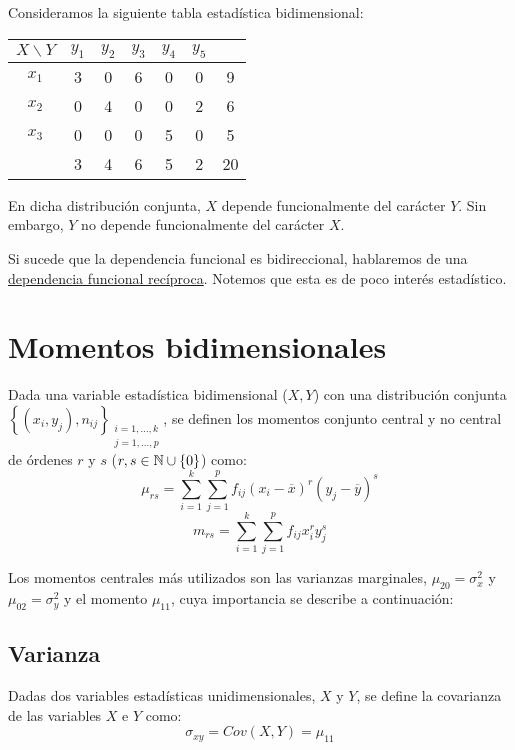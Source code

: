 \begin{ejemplo} Consideramos la siguiente tabla estadística bidimensional:
    \begin{center}
    \begin{tabular}{c|c|c|c|c|c|c}
        $X \backslash Y$ & $y_1$ & $y_2$ & $y_3$ & $y_4$ & $y_5$ &    \\
        \hline
        $x_1$            & 3     & 0     & 6     & 0     & 0     & 9  \\
        \hline
        $x_2$            & 0     & 4     & 0     & 0     & 2     & 6  \\
        \hline
        $x_3$            & 0     & 0     & 0     & 5     & 0     & 5  \\
        \hline
                         & 3     & 4     & 6     & 5     & 2     & 20 \\
    \end{tabular}
    \end{center}
    
    
    En dicha distribución conjunta, $X$ depende funcionalmente del carácter $Y$. Sin embargo, $Y$ no depende
    funcionalmente del carácter $X$.
\end{ejemplo}

Si sucede que la dependencia funcional es bidireccional, hablaremos de una \underline{dependencia funcional recíproca}.
Notemos que esta es de poco interés estadístico.

\section{Momentos bidimensionales}

Dada una variable estadística bidimensional ($X,Y$) con una distribución conjunta
$\left\{ (x_i,y_j), n_{ij}\right\}_{\substack{i=1,\dots,k\\j=1,\dots,p}}$, se definen los momentos conjunto central y no central de órdenes $r$ y $s$
($r,s \in \mathbb N \cup \{0\}$) como:
$$\mu_{rs} = \sum_{i=1}^k \sum_{j=1}^p f_{ij} (x_i - \overline{x})^r (y_j - \overline{y})^s$$
$$m_{rs}=\sum_{i=1}^k \sum_{j=1}^p f_{ij} x_i^r y_j^s$$


Los momentos centrales más utilizados son las varianzas marginales, $\mu_{20} = \sigma_x^2$ y $\mu_{02}=\sigma_y^2$
y el momento $\mu_{11}$, cuya importancia se describe a continuación:

\subsection{Varianza}
\begin{definicion} Dadas dos variables estadísticas unidimensionales, $X$ y $Y$, se define la covarianza de las variables $X$ e $Y$ como:
\begin{equation*}
    \sigma_{xy} = Cov(X,Y) = \mu_{11}
\end{equation*}
\end{definicion}

